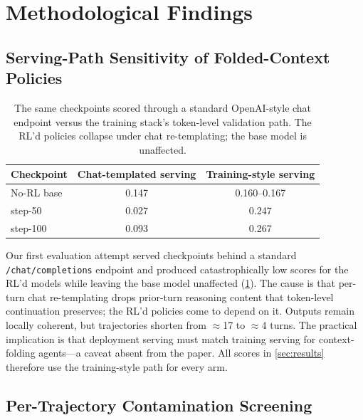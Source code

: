 \section{Methodological Findings}
\label{sec:method-findings}

\subsection{Serving-Path Sensitivity of Folded-Context Policies}
\label{sec:serving}

\begin{table}[t]
\centering
\small
\begin{tabular}{lcc}
\toprule
Checkpoint & Chat-templated serving & Training-style serving \\
\midrule
No-RL base & 0.147 & 0.160--0.167 \\
\foldgrpo{} step-50 & 0.027 & 0.247 \\
\foldgrpo{} step-100 & 0.093 & 0.267 \\
\bottomrule
\end{tabular}
\caption{The same checkpoints scored through a standard OpenAI-style chat endpoint versus the
training stack's token-level validation path. The RL'd policies collapse under chat
re-templating; the base model is unaffected.}
\label{tab:serving}
\end{table}

Our first evaluation attempt served checkpoints behind a standard \texttt{/chat/completions}
endpoint and produced catastrophically low scores for the RL'd models while leaving the base
model unaffected (\cref{tab:serving}). The cause is that per-turn chat re-templating drops
prior-turn reasoning content that token-level continuation preserves; the RL'd policies come to
depend on it. Outputs remain locally coherent, but trajectories shorten from $\approx$17 to
$\approx$4 turns. The practical implication is that deployment serving must match training
serving for context-folding agents---a caveat absent from the paper. All scores in
\cref{sec:results} therefore use the training-style path for every arm.

\subsection{Per-Trajectory Contamination Screening}
\label{sec:contamination}

